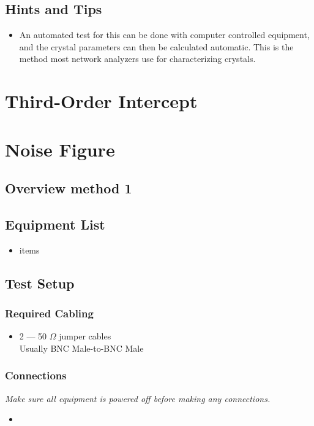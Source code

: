 \documentclass[10pt,letterpaper]{book}
\begin{document}
\subsection*{Hints and Tips}
\begin{itemize}
\item An automated test for this can be done with computer controlled equipment, and the crystal parameters can then be calculated automatic. This is the method most network analyzers use for characterizing crystals.
\end{itemize}





\section{Third-Order Intercept}
\section{Noise Figure}
\subsection*{Overview method 1}
\subsection*{Equipment List}
\begin{itemize}
	\item items
\end{itemize}
\subsection*{Test Setup}
\subsubsection*{Required Cabling}
\begin{itemize}
	\item 2 --- 50 $\Omega$ jumper cables \\
		Usually BNC Male-to-BNC Male
\end{itemize}
\subsubsection*{Connections}
\emph{Make sure all equipment is powered off before making any connections.}
\begin{itemize}
	\item
\end{itemize}
\end{document}
